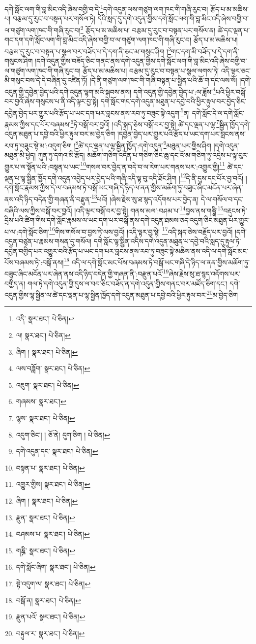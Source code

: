 དགེ་སློང་ལག་གི་བླ་མིང་འདི་ཞེས་བགྱི་བ་དེ་\footnote{འདི་  སྣར་ཐང་།  པེ་ཅིན། }དགེ་འདུན་ལས་གཙུག་ལག་ཁང་གི་གཞི་རུང་བ། རྩོད་པ་མ་མཆིས་པ། བརྩམ་དུ་རུང་བ་བསྟན་པར་གསོལ་ཏེ། དེའི་སླད་དུ་དགེ་འདུན་གྱིས་དགེ་སློང་ལག་གི་བླ་མིང་འདི་ཞེས་བགྱི་བ་ལ་གཙུག་ལག་ཁང་གི་གཞི་རུང་བ།\footnote{ལ།  སྣར་ཐང་།  པེ་ཅིན། } རྩོད་པ་མ་མཆིས་པ། བརྩམ་དུ་རུང་བ་བསྟན་པར་གསོལ་ན། ཚེ་དང་ལྡན་པ་གང་དག་དགེ་སློང་ལག་གི་བླ་མིང་འདི་ཞེས་བགྱི་བ་ལ་གཙུག་ལག་ཁང་གི་གཞི་རུང་བ། རྩོད་པ་མ་མཆིས་པ། བརྩམ་དུ་རུང་བ་བསྟན་པ་སྩལ་བར་བཟོད་པ་དེ་དག་ནི་ཅང་མ་གསུང་ཤིག །\footnote{ཞིག །  སྣར་ཐང་།  པེ་ཅིན། }གང་དག་མི་བཟོད་པ་དེ་དག་ནི་གསུངས་ཤིག །དགེ་འདུན་གྱིས་བཟོད་ཅིང་གནང་ནས་དགེ་འདུན་གྱིས་དགེ་སློང་ལག་གི་བླ་མིང་འདི་ཞེས་བགྱི་བ་ལ་གཙུག་ལག་ཁང་གི་གཞི་རུང་བ། རྩོད་པ་མ་མཆིས་པ། བརྩམ་དུ་རུང་བ་བསྟན་པ་སྩལ་ལགས་ཏེ། འདི་ལྟར་ཅང་མི་གསུང་བས་དེ་དེ་བཞིན་དུ་འཛིན་ཏོ། །དེ་ནི་གཙུག་ལག་ཁང་གི་གཞི་བསྟན་པ་སྦྱིན་པའི་ཆོ་ག་དང་ལས་སོ། །དགེ་འདུན་གྱི་དབྱེན་བྱེད་པའི་དགེ་འདུན་ལྷག་མའི་སྐབས་ནས། དགེ་འདུན་གྱི་དབྱེན་བྱེད་པ་:ལ་ཟློས་\footnote{ལས་བཟློག་  སྣར་ཐང་།  པེ་ཅིན། }པའི་ཕྱིར་བསྒོ་བར་བྱའོ་ཞེས་གསུངས་པ་ནི་འདི་ལྟར་བྱ་སྟེ། དགེ་སློང་གང་དགེ་འདུན་མཐུན་པ་དབྱེ་བའི་ཕྱིར་རྟུལ་བར་བྱེད་ཅིང་དབྱེན་བྱེད་པར་གྱུར་པའི་རྩོད་པ་ཡང་དག་པར་བླངས་ནས་རབ་ཏུ་བཟུང་སྟེ་འདུག་\footnote{འཇུག་  སྣར་ཐང་།  པེ་ཅིན། }ན། དགེ་སློང་དེ་ལ་དགེ་སློང་རྣམས་ཀྱིས་དང་པོར་བཞམས་\footnote{གཞམས་  སྣར་ཐང་། }ཏེ་བསྒོ་བར་བྱའོ། །འདི་སྐད་ཅེས་བསྒོ་བར་བྱ་སྟེ། ཚེ་དང་ལྡན་པ་ལྷ་\footnote{ལྷས་  སྣར་ཐང་།  པེ་ཅིན། }སྦྱིན་ཁྱོད་དགེ་འདུན་མཐུན་པ་དབྱེ་བའི་ཕྱིར་རྟུལ་བར་མ་བྱེད་ཅིག །དབྱེན་བྱེད་པར་གྱུར་པའི་རྩོད་པ་ཡང་དག་པར་བླངས་ནས་རབ་ཏུ་བཟུང་སྟེ་མ་:འདུག་ཅིག །\footnote{འདུག་ཅིང་། །  ཅོ་ནེ། དུག་ཅིག །  པེ་ཅིན། }ཚེ་དང་ལྡན་པ་ལྷ་སྦྱིན་ཁྱོད་:དགེ་འདུན་\footnote{དགེ་འདུན་དང་  སྣར་ཐང་།  པེ་ཅིན། }མཐུན་པར་གྱིས་ཤིག །དགེ་འདུན་མཐུན་མི་ཕྱེད། ཀུན་ཏུ་དགའ་མི་རྩོད། མཆོག་གཅིག་འདོན་པ་གཅིག་ཅིང་ཆུ་དང་འོ་མ་གཅིག་ཏུ་འདྲེས་པ་ལྟ་བུར་གྱུར་པ་ལ་སྟོན་པའི་:བསྟན་པ་ཡང་\footnote{བསྟན་པ་  སྣར་ཐང་།  པེ་ཅིན། }གསལ་བར་བྱེད་ན་བདེ་བ་ལ་རེག་པར་གནས་པར་:འགྱུར་གྱི།\footnote{འགྱུར་གྱིས།  སྣར་ཐང་།  པེ་ཅིན། } ཚེ་དང་ལྡན་པ་ལྷ་སྦྱིན་ཁྱོད་དགེ་འདུན་འབྱེད་པར་བྱེད་པའི་གཞི་འདི་ལྟ་བུ་འདི་ཐོང་ཤིག །\footnote{ཞིག །  སྣར་ཐང་།  པེ་ཅིན། }དེ་ནི་དུས་དང་པོར་བྱ་བའོ། །དགེ་སློང་རྣམས་ཀྱིས་དེ་ལ་བཞམས་ཏེ་བསྒོ་ཡང་གཞི་དེ་ཉིད་ལ་ནན་གྱིས་མཆོག་ཏུ་བཟུང་ཞིང་མངོན་པར་ཞེན་ནས་འདི་ཉིད་བདེན་གྱི་གཞན་ནི་བརྫུན་\footnote{རྫུན་  སྣར་ཐང་།  པེ་ཅིན། }པའོ། །ཞེས་རྗེས་སུ་ཐ་སྙད་འདོགས་པར་བྱེད་ན། དེ་ལ་གསོལ་བ་དང་བཞིའི་ལས་ཀྱིས་བསྒོ་བར་བྱའོ། །འདི་ལྟར་བསྒོ་བར་བྱ་སྟེ། གནས་མལ་:བཤམ་པ་\footnote{བཤམས་པ་  སྣར་ཐང་།  པེ་ཅིན། }བྱས་ནས་གཎྜཱི་\footnote{གཎྜི་  སྣར་ཐང་།  པེ་ཅིན། }བརྡུངས་ཏེ་དྲིས་པའི་ཚིག་གིས་དགེ་སློང་རྣམས་ལ་ཡང་དག་པར་བསྒོ་ནས་དགེ་འདུན་ཐམས་ཅད་འདུག་ཅིང་མཐུན་པར་གྱུར་པ་ལ་:དགེ་སློང་ཅིག་\footnote{དགེ་སློང་ཞིག་  སྣར་ཐང་།  པེ་ཅིན། }གིས་གསོལ་བ་བྱས་ཏེ་ལས་བྱའོ། །འདི་ལྟར་བྱ་སྟེ། \footnote{སྟེ་འདུག་ལ་  སྣར་ཐང་།  པེ་ཅིན། }འདི་སྐད་ཅེས་བརྗོད་པར་བྱའོ། །དགེ་འདུན་བཙུན་པ་རྣམས་གསན་དུ་གསོལ། དགེ་སློང་ལྷ་སྦྱིན་འདིས་དགེ་འདུན་མཐུན་པ་དབྱེ་བའི་སླད་དུ་རྟུལ་ཏེ་དབྱེན་བགྱིད་པར་འགྱུར་བའི་རྩོད་པ་ཡང་དག་པར་བླངས་ནས་རབ་ཏུ་བཟུང་སྟེ་མཆིས་ནས་འདི་ལ་དགེ་སློང་མང་པོས་བཞམས་ཏེ་:བསྒོ་ནས།\footnote{བསྒོ་ན།  སྣར་ཐང་།  པེ་ཅིན། } འདི་ལ་དགེ་སློང་མང་པོས་བཞམས་ཏེ་བསྒོ་ཡང་གཞི་དེ་ཉིད་ལ་ནན་གྱིས་མཆོག་ཏུ་བཟུང་ཞིང་མངོན་པར་ཞེན་ནས་འདི་ཉིད་བདེན་གྱི་གཞན་ནི་:བརྫུན་པའོ་\footnote{རྫུན་པའོ་  སྣར་ཐང་།  པེ་ཅིན། }ཞེས་རྗེས་སུ་ཐ་སྙད་འདོགས་པར་བགྱིད་ན། གལ་ཏེ་དགེ་འདུན་གྱི་དུས་ལ་བབ་ཅིང་བཟོད་ན་དགེ་འདུན་གྱིས་གནང་བར་མཛོད་ཅིག་དང་། དགེ་འདུན་གྱིས་ལྷ་སྦྱིན་ལ་ཚེ་དང་ལྡན་པ་ལྷ་སྦྱིན་ཁྱོད་དགེ་འདུན་མཐུན་པ་དབྱེ་བའི་ཕྱིར་རྟུལ་བར་\footnote{བརྟུལ་ར་  སྣར་ཐང་།  པེ་ཅིན། }མ་བྱེད་ཅིག 